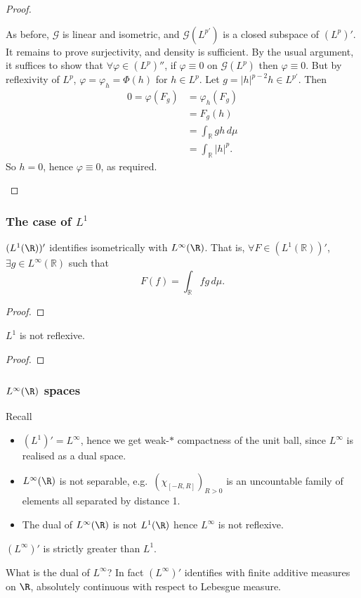 \documentclass[twoside]{article}
\begin{document}
\begin{proof}
\begin{enumerate}[label=\arabic*)]
    As before, $\mathcal{G}$ is linear and isometric, and $\mathcal{G}(L^{p'})$ is a closed subspace of $(L^p)'$.
    It remains to prove surjectivity, and density is sufficient.
    By the usual  argument, it suffices to show that $\forall \varphi\in (L^p)''$, if $\varphi \equiv 0$ on $\mathcal{G}(L^p)$ then $\varphi \equiv 0$.
    But by reflexivity of $L^p$, $\varphi = \varphi_h = \Phi(h)$ for $h \in L^p$.
    Let $g = |h|^{p-2} h \in L^{p'}$.  Then
    \begin{align*}
      0 = \varphi(F_g) &= \varphi_h(F_g) \\
                   &= F_g(h) \\
                   &= \int_\mathbb{R} gh\,d\mu \\
                   &= \int_\mathbb{R} |h|^p.
    \end{align*}
    So $h = 0$, hence $\varphi \equiv 0$, as required. \qedhere
  \end{enumerate}
\end{proof}
\subsubsection*{The case of $L^1$}
\begin{thm}
    $(L^1(\R))'$ identifies isometrically with $L^\infty(\R)$.
    That is, $\forall F \in (L^1(\mathbb{R}))'$, $\exists g \in L^\infty(\mathbb{R})$ such that
    \begin{equation*}
      F(f) = \int_\mathbb{R} fg \,d\mu.
    \end{equation*}
\end{thm}
\begin{proof}
\end{proof}
\begin{cor}
    $L^1$ is not reflexive.
\end{cor}
\begin{proof}
\end{proof}
\subsubsection*{$L^\infty(\R)$ spaces}
Recall
\begin{itemize}
    \item $(L^1)' = L^\infty$, hence we get weak-$*$ compactness of the unit ball, since $L^\infty$ is realised as a dual space.
    \item $L^\infty(\R)$ is not separable, e.g.\ $(\chi_{[-R, R]})_{R > 0}$ is an uncountable family of elements all separated by distance 1.
    \item The dual of $L^\infty(\R)$ is not $L^1(\R)$ hence $L^\infty$ is not reflexive.
\end{itemize}
\begin{prop}
    $(L^\infty)'$ is strictly greater than $L^1$.
\end{prop}
\begin{remark}
    What is the dual of $L^\infty$? In fact $(L^\infty)'$ identifies with finite additive measures on $\R$, absolutely continuous with respect to Lebesgue measure.
\end{remark}
\end{document}
